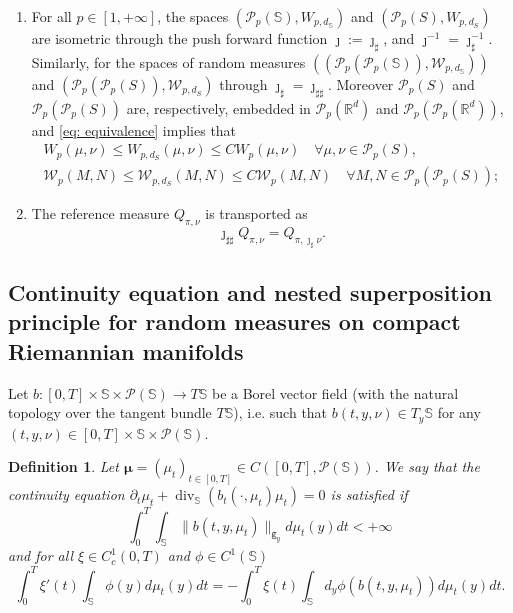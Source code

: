 \documentclass[10pt,leqno]{amsart}
\numberwithin{equation}{section}
\newtheorem{df}[teorema]{Definition}
\newcommand{\R}{\mathbb{R}}
\newcommand{\PP}{\mathcal{P}}
\newcommand{\ttg}{\mathtt{g}}
\newcommand{\Ss}{\mathbb{S}}
\begin{document}
\begin{enumerate}
    In particular, if $\nu\ll \operatorname{vol}_\Ss$, then $\tilde{\nu}:= \jmath_\sharp \nu$ is absolutely continuous w.r.t. $\mathcal{H}^k|_{S}$, with density given by $\frac{d\nu}{d\operatorname{vol}_{\mathbb{S}}}\circ \jmath^{-1}$;
    \item For all $p\in[1,+\infty]$, the spaces $(\PP_p(\mathbb{S}),W_{p,d_{\mathbb{S}}})$ and $(\PP_p(S),W_{p,d_S})$ are isometric through the push forward function $\boldsymbol{\jmath}:= \jmath_{\sharp}$, and $\boldsymbol{\jmath}^{-1} = \jmath^{-1}_\sharp$. Similarly, for the spaces of random measures $((\PP_p(\PP_p(\mathbb{S})),\mathcal{W}_{p,d_{\mathbb{S}}}))$ and $(\PP_p(\PP_p(S)),\mathcal{W}_{p,d_S})$ through $\boldsymbol{\jmath}_\sharp = \jmath_{\sharp\sharp}$. Moreover $\PP_p(S)$ and $\PP_p(\PP_p(S))$ are, respectively, embedded in $\PP_p(\R^d)$ and $\PP_p(\PP_p(\R^d))$, and \eqref{eq: equivalence} implies that 
    \begin{equation}
        \begin{gathered}
        W_p(\mu,\nu)\leq W_{p,d_{S}}(\mu,\nu) \leq C W_{p}(\mu,\nu) \quad \forall \mu,\nu\in \PP_p(S),
        \\
        \mathcal{W}_{p}(M,N) \leq \mathcal{W}_{p,d_S}(M,N)\leq C\mathcal{W}_{p}(M,N) \quad \forall M,N \in \PP_p(\PP_p(S));
        \end{gathered}
    \end{equation}
    \item The reference measure $Q_{\pi,\nu}$ is transported as
    \begin{equation}\label{eq: nash ref measure}
        \jmath_{\sharp\sharp}Q_{\pi,\nu} = Q_{\pi,\jmath_\sharp \nu}. 
    \end{equation}
\end{enumerate}



\subsection{Continuity equation and nested superposition principle for random measures on compact Riemannian manifolds}

Let $b:[0,T]\times \Ss \times \PP(\Ss) \to T \Ss$ be a Borel vector field (with the natural topology over the tangent bundle $T\Ss$), i.e. such that $b(t,y,\nu) \in T_y \Ss$ for any $(t,y,\nu) \in [0,T]\times \Ss \times \PP(\Ss)$.

\begin{df}\label{ce manifold}
    Let $\boldsymbol{\mu} = (\mu_t)_{t\in [0,T]} \in C([0,T],\PP(\Ss))$. We say that the continuity equation $\partial_t\mu_t + \operatorname{div}_{\Ss}(b_t(\cdot,\mu_t) \mu_t) = 0$ is satisfied if 
    \begin{equation}
        \int_0^T \int_\Ss \lVert b(t,y,\mu_t) \rVert_{\ttg_{y}} d\mu_t(y) dt <+\infty
    \end{equation}
    and for all $\xi\in C_c^1(0,T)$ and $\phi\in C^1(\Ss)$
    \begin{equation}\label{weak ce manifold}
        \int_0^T \xi'(t) \int_{\Ss} \phi(y) d\mu_t(y) dt = -\int_0^T \xi(t) \int_\Ss d_y\phi(b(t,y,\mu_t)) d\mu_t(y) dt.
    \end{equation}
\end{df}
\end{document}
